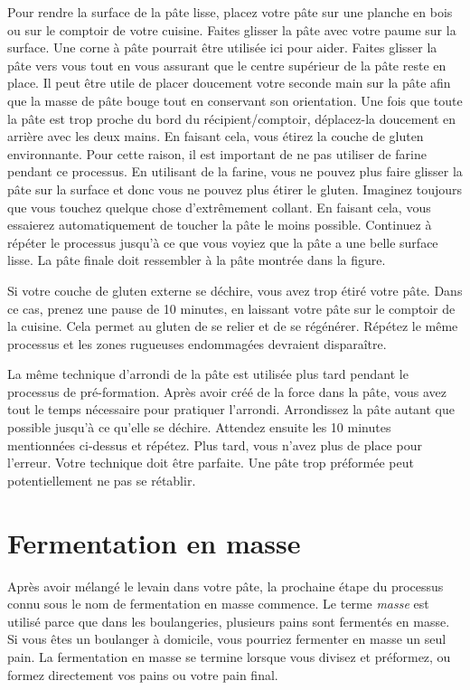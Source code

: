 Pour rendre la surface de la pâte lisse, placez votre pâte sur une planche en bois ou sur le comptoir de votre cuisine. Faites glisser la pâte avec votre paume sur la surface. Une corne à pâte pourrait être utilisée ici pour aider. Faites glisser la pâte vers vous tout en vous assurant que le centre supérieur de la pâte reste en place. Il peut être utile de placer doucement votre seconde main sur la pâte afin que la masse de pâte bouge tout en conservant son orientation. Une fois que toute la pâte est trop proche du bord du récipient/comptoir, déplacez-la doucement en arrière avec les deux mains. En faisant cela, vous étirez la couche de gluten environnante. Pour cette raison, il est important de ne pas utiliser de farine pendant ce processus. En utilisant de la farine, vous ne pouvez plus faire glisser la pâte sur la surface et donc vous ne pouvez plus étirer le gluten. Imaginez toujours que vous touchez quelque chose d'extrêmement collant. En faisant cela, vous essaierez automatiquement de toucher la pâte le moins possible. Continuez à répéter le processus jusqu'à ce que vous voyiez que la pâte a une belle surface lisse. La pâte finale doit ressembler à la pâte montrée dans la figure.

Si votre couche de gluten externe se déchire, vous avez trop étiré votre pâte. Dans ce cas, prenez une pause de 10 minutes, en laissant votre pâte sur le comptoir de la cuisine. Cela permet au gluten de se relier et de se régénérer. Répétez le même processus et les zones rugueuses endommagées devraient disparaître.

La même technique d'arrondi de la pâte est utilisée plus tard pendant le processus de pré-formation. Après avoir créé de la force dans la pâte, vous avez tout le temps nécessaire pour pratiquer l'arrondi. Arrondissez la pâte autant que possible jusqu'à ce qu'elle se déchire. Attendez ensuite les 10 minutes mentionnées ci-dessus et répétez. Plus tard, vous n'avez plus de place pour l'erreur. Votre technique doit être parfaite. Une pâte trop préformée peut potentiellement ne pas se rétablir.

\section{Fermentation en masse}Après avoir mélangé le levain dans votre pâte, la prochaine étape du processus connu sous le nom de fermentation en masse commence. Le terme \emph{masse} est utilisé parce que dans les boulangeries, plusieurs pains sont fermentés en masse. Si vous êtes un boulanger à domicile, vous pourriez fermenter en masse un seul pain. La fermentation en masse se termine lorsque vous divisez et préformez, ou formez directement vos pains ou votre pain final.

